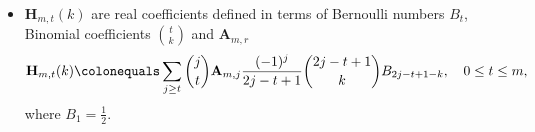 \documentclass[12pt, letterpaper]{amsart}
\newenvironment{myitemize}
{ \begin{itemize}
    \setlength{\itemsep}{4pt}
    \setlength{\parskip}{4pt}
    \setlength{\parsep}{4pt}     }
{ \end{itemize}                  }
\theoremstyle{definition}
\theoremstyle{remark}
\numberwithin{equation}{section}
\begin{document}
\begin{myitemize}
\begin{equation*}
\mathbf{X}^{m}_{t}(a,b)\colonequals (-1)^m \sum\limits_{j\geq t} \mathbf{A}_{m,j} (-1)^j \binom{j}{t} \sum\limits_{a\leq k<b}k^{2j-t}, \quad 0\leq t\leq m.
\end{equation*}
Notation $\mathbf{X}^{m}_{t}(b)$ is an equivalent to $\mathbf{X}^{m}_{t}(a,b)$ with set $a=0$, i.e $\mathbf{X}^{m}_{t}(b) \equiv \mathbf{X}^{m}_{t}(0,b)$.
\item $\mathbf{H}_{m,t}(k)$ are real coefficients defined in terms of Bernoulli numbers $B_t$, Binomial coefficients $\binom{t}{k}$ and $\mathbf{A}_{m,r}$
\begin{equation*}
\mathbf{H}_{m,t}(k)\colonequals \sum\limits_{j\geq t}\binom{j}{t}\mathbf{A}_{m,j} \frac{(-1)^j}{2j-t+1}\binom{2j-t+1}{k}B_{2j-t+1-k}, \quad 0\leq t\leq m,
\end{equation*}
where $B_1=\tfrac12$.
\end{myitemize}
\end{document}
